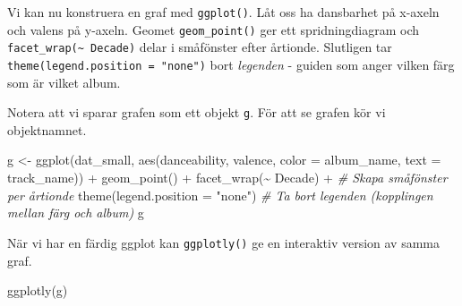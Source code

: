 \documentclass[
]{book}
\newenvironment{Shaded}{\begin{snugshade}}{\end{snugshade}}
\newcommand{\AttributeTok}[1]{\textcolor[rgb]{0.77,0.63,0.00}{#1}}
\newcommand{\CommentTok}[1]{\textcolor[rgb]{0.56,0.35,0.01}{\textit{#1}}}
\newcommand{\FunctionTok}[1]{\textcolor[rgb]{0.00,0.00,0.00}{#1}}
\newcommand{\NormalTok}[1]{#1}
\newcommand{\OtherTok}[1]{\textcolor[rgb]{0.56,0.35,0.01}{#1}}
\newcommand{\SpecialCharTok}[1]{\textcolor[rgb]{0.00,0.00,0.00}{#1}}
\newcommand{\StringTok}[1]{\textcolor[rgb]{0.31,0.60,0.02}{#1}}
\theoremstyle{definition}
\theoremstyle{definition}
\theoremstyle{definition}
\theoremstyle{definition}
\theoremstyle{remark}
\begin{document}
Vi kan nu konstruera en graf med \texttt{ggplot()}. Låt oss ha dansbarhet på x-axeln och valens på y-axeln. Geomet \texttt{geom\_point()} ger ett spridningdiagram och \texttt{facet\_wrap(\textasciitilde{}\ Decade)} delar i småfönster efter årtionde. Slutligen tar \texttt{theme(legend.position\ =\ "none")} bort \emph{legenden} - guiden som anger vilken färg som är vilket album.

Notera att vi sparar grafen som ett objekt \texttt{g}. För att se grafen kör vi objektnamnet.

\begin{Shaded}
\begin{Highlighting}[]
\NormalTok{g }\OtherTok{\textless{}{-}} \FunctionTok{ggplot}\NormalTok{(dat\_small, }\FunctionTok{aes}\NormalTok{(danceability, valence, }\AttributeTok{color =}\NormalTok{ album\_name, }\AttributeTok{text =}\NormalTok{ track\_name)) }\SpecialCharTok{+}
  \FunctionTok{geom\_point}\NormalTok{() }\SpecialCharTok{+}
  \FunctionTok{facet\_wrap}\NormalTok{(}\SpecialCharTok{\textasciitilde{}}\NormalTok{ Decade) }\SpecialCharTok{+}            \CommentTok{\# Skapa småfönster per årtionde}
  \FunctionTok{theme}\NormalTok{(}\AttributeTok{legend.position =} \StringTok{"none"}\NormalTok{)   }\CommentTok{\# Ta bort legenden (kopplingen mellan färg och album)}
\NormalTok{g}
\end{Highlighting}
\end{Shaded}

När vi har en färdig ggplot kan \texttt{ggplotly()} ge en interaktiv version av samma graf.

\begin{Shaded}
\begin{Highlighting}[]
\FunctionTok{ggplotly}\NormalTok{(g)}
\end{Highlighting}
\end{Shaded}
\end{document}
